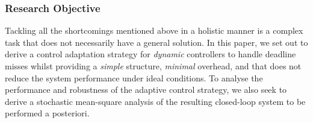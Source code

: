 \subsubsection*{Research Objective}
Tackling all the shortcomings mentioned above in a holistic manner is a complex task that does not necessarily have a general solution.
In this paper, we set out to derive a control adaptation strategy for \emph{dynamic} controllers to handle deadline misses whilst providing a \emph{simple} structure, \emph{minimal} overhead, and that does not reduce the system performance under ideal conditions.
To analyse the performance and robustness of the adaptive control strategy, we also seek to derive a stochastic mean-square analysis of the resulting closed-loop system to be performed a posteriori.
